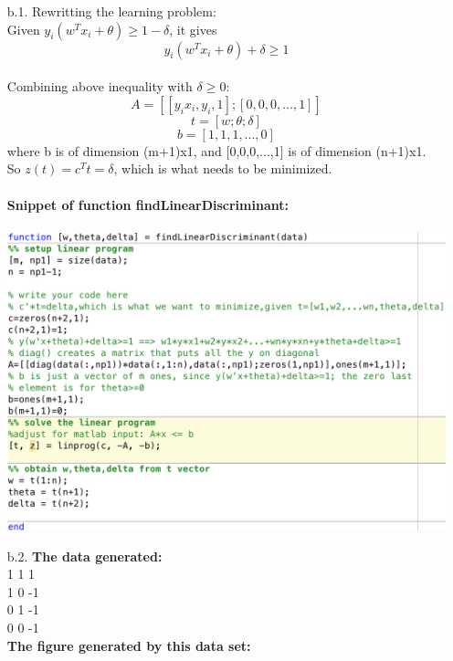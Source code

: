 \begin{enumerate}
\begin{enumerate}
	\end{enumerate}
	\begin{enumerate}
		\item[b.1.] Rewritting the learning problem:\\
					Given  \(y_i(w^Tx_i+\theta)\geq 1-\delta \), it gives
					 \[y_i(w^Tx_i+\theta)+\delta\geq 1\]\\
					Combining above inequality with \(\delta \geq 0\):
					\[A=[[y_ix_i,y_i,1];[0,0,0,...,1]]\]
					\[t=[w;\theta;\delta]\]
					\[b=[1,1,1,...,0]\]
					where b is of dimension (m+1)x1, and [0,0,0,...,1] is of dimension (n+1)x1.\\
					So \(z(t)=c^Tt=\delta\), which is what needs to be minimized.\\\\
					\textbf{Snippet of function findLinearDiscriminant:}\\\\
					\includegraphics[scale=0.6]{pic/findLinearDiscriminant.png}
		\item[b.2.] \textbf{The data generated:}\\
					1 1 1\\
					1 0 -1\\
					0 1 -1\\
					0 0 -1\\
					\textbf{The figure generated by this data set:}\\

\end{enumerate}
\end{enumerate}
